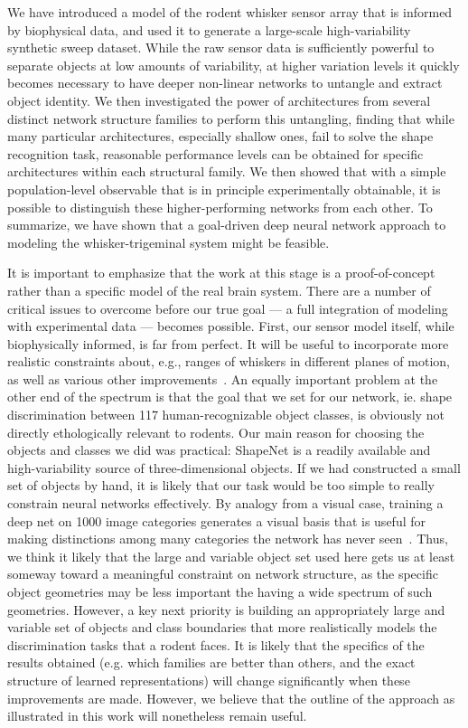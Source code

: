 We have introduced a model of the rodent whisker sensor array that is informed by biophysical data, and used it to generate a large-scale high-variability synthetic sweep dataset. 
While the raw sensor data is sufficiently powerful to separate objects at low amounts of variability, at higher variation levels it quickly becomes necessary to have deeper non-linear networks to untangle and extract object identity. 
We then investigated the power of architectures from several distinct network structure families to perform this untangling, finding that while many particular architectures, especially shallow ones, fail to solve the shape recognition task, reasonable performance levels can be obtained for specific architectures within each structural family.
We then showed that with a simple population-level observable that is in principle experimentally obtainable, it is possible to distinguish these higher-performing networks from each other. 
To summarize, we have shown that a goal-driven deep neural network approach to modeling the whisker-trigeminal system might be feasible. 

It is important to emphasize that the work at this stage is a proof-of-concept rather than a specific model of the real brain system.  
There are a number of critical issues to overcome before our true goal --- a full integration of modeling with experimental data --- becomes possible.    
First, our sensor model itself, while biophysically informed, is far from perfect. 
It will be useful to incorporate more realistic constraints about, e.g., ranges of whiskers in different planes of motion, as well as various other improvements~\cite{Quist2014, Huet2016}.
An equally important problem at the other end of the spectrum is that the goal that we set for our network, ie. shape discrimination between 117 human-recognizable object classes, is obviously not directly ethologically relevant to rodents. 
Our main reason for choosing the objects and classes we did was practical: ShapeNet is a readily available and high-variability source of three-dimensional objects. 
If we had constructed a small set of objects by hand, it is likely that our task would be too simple to really constrain neural networks effectively. 
By analogy from a visual case, training a deep net on 1000 image categories generates a visual basis that is useful for making distinctions among many categories the network has never seen~\cite{Yamins2014,cadieu2014deep,razavian2014cnn}.
Thus, we think it likely that the large and variable object set used here gets us at least someway toward a meaningful constraint on network structure, as the specific object geometries may be less important the having a wide spectrum of such geometries. 
However, a key next priority is building an appropriately large and variable set of objects and class boundaries that more realistically models the discrimination tasks that a rodent faces.
It is likely that the specifics of the results obtained (e.g. which families are better than others, and the exact structure of learned representations) will change significantly when these improvements are made.  
However, we believe that the outline of the approach as illustrated in this work will nonetheless remain useful. 

